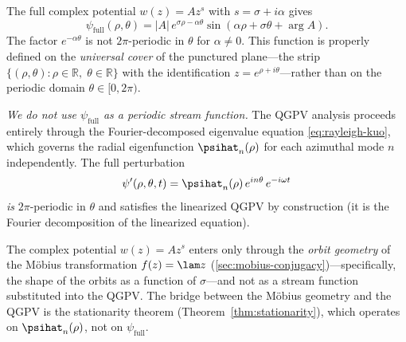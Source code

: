 \begin{remark}
\label{rem:stream-function}
The full complex potential $w(z) = Az^s$ with $s = \sigma + i\alpha$ gives
\begin{equation}\label{eq:psi-full}
  \psi_{\mathrm{full}}(\rho,\theta)
  = |A|\,e^{\sigma\rho - \alpha\theta}
  \sin(\alpha\rho + \sigma\theta + \arg A).
\end{equation}
The factor $e^{-\alpha\theta}$ is not $2\pi$-periodic in $\theta$ for
$\alpha \neq 0$.  This function is properly defined on the
\emph{universal cover} of the punctured plane---the strip
$\{(\rho,\theta) : \rho \in \mathbb{R},\; \theta \in \mathbb{R}\}$
with the identification $z = e^{\rho + i\theta}$---rather than on
the periodic domain $\theta \in [0, 2\pi)$.

\emph{We do not use $\psi_{\mathrm{full}}$ as a periodic stream function.}
The QGPV analysis proceeds entirely through the Fourier-decomposed
eigenvalue equation \eqref{eq:rayleigh-kuo}, which governs the radial
eigenfunction $\psihat_n(\rho)$ for each azimuthal mode $n$ independently.
The full perturbation
\begin{equation}\label{eq:fourier-mode}
  \psi'(\rho,\theta,t) = \psihat_n(\rho)\,e^{in\theta}\,e^{-i\omega t}
\end{equation}
\emph{is} $2\pi$-periodic in $\theta$ and satisfies the linearized QGPV
by construction (it is the Fourier decomposition of the linearized
equation).

The complex potential $w(z) = Az^s$ enters only through the \emph{orbit
geometry} of the M\"obius transformation $f(z) = \lam z$
(\cref{sec:mobius-conjugacy})---specifically, the shape of the orbits
as a function of $\sigma$---and not as a stream function substituted
into the QGPV.  The bridge between the M\"obius geometry and the QGPV
is the stationarity theorem (Theorem~\ref{thm:stationarity}), which
operates on $\psihat_n(\rho)$, not on $\psi_{\mathrm{full}}$.
\end{remark}
